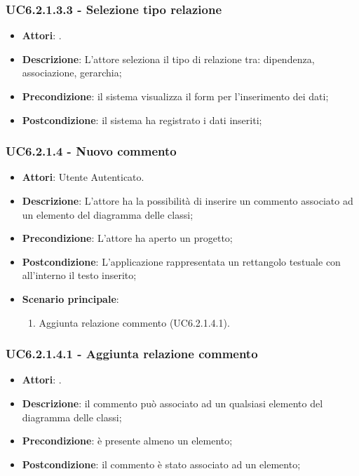 \subsubsection{UC6.2.1.3.3 - Selezione tipo relazione} 
\label{sssec:UC6.2.1.3.3} 
\begin{itemize} 
\item \textbf{Attori}: .
\item \textbf{Descrizione}: L'attore seleziona il tipo di relazione tra: dipendenza, associazione, gerarchia;
\item \textbf{Precondizione}: il sistema visualizza il form per l'inserimento dei dati;
\item \textbf{Postcondizione}: il sistema ha registrato i dati inseriti;
\end{itemize} 
\subsubsection{UC6.2.1.4 - Nuovo commento} 
\label{sssec:UC6.2.1.4} 
\begin{itemize} 
\item \textbf{Attori}: Utente Autenticato.
\item \textbf{Descrizione}: L'attore ha la possibilità di inserire un commento associato ad un elemento del diagramma delle classi;
\item \textbf{Precondizione}: L'attore ha aperto un progetto;
\item \textbf{Postcondizione}: L'applicazione rappresentata un rettangolo testuale con all'interno il testo inserito;
\item \textbf{Scenario principale}: \begin{enumerate}\item Aggiunta relazione commento (UC6.2.1.4.1). 
 \end{enumerate}
\end{itemize} 
\subsubsection{UC6.2.1.4.1 - Aggiunta relazione commento} 
\label{sssec:UC6.2.1.4.1} 
\begin{itemize} 
\item \textbf{Attori}: .
\item \textbf{Descrizione}: il commento può associato ad un qualsiasi elemento del diagramma delle classi;
\item \textbf{Precondizione}: è presente almeno un elemento;
\item \textbf{Postcondizione}: il commento è stato associato ad un elemento;
\end{itemize} 
